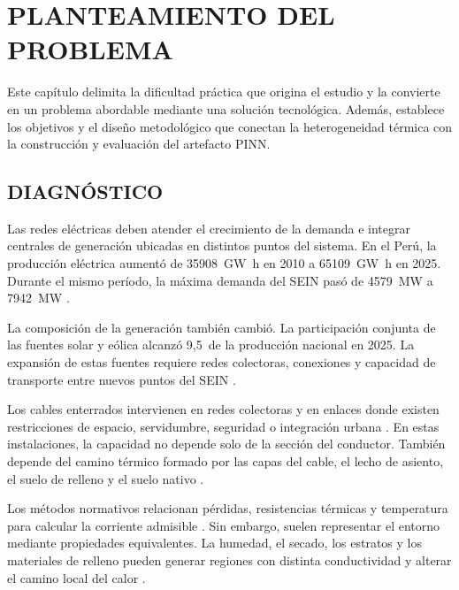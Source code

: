 \chapter{PLANTEAMIENTO DEL PROBLEMA}
\label{ch:planteamiento}

Este capítulo delimita la dificultad práctica que origina el estudio y la convierte en un problema abordable mediante una solución tecnológica. Además, establece los objetivos y el diseño metodológico que conectan la heterogeneidad térmica con la construcción y evaluación del artefacto PINN.

\section{DIAGNÓSTICO}
\label{sec:diagnostico}

Las redes eléctricas deben atender el crecimiento de la demanda e integrar centrales de generación ubicadas en distintos puntos del sistema. En el Perú, la producción eléctrica aumentó de \SI{35908}{\giga\watt\hour} en 2010 a \SI{65109}{\giga\watt\hour} en 2025. Durante el mismo período, la máxima demanda del SEIN pasó de \SI{4579}{\mega\watt} a \SI{7942}{\mega\watt} \parencites[sec.~10.4]{minem2025anuario2024}[cuadro~4]{minem2025indicadoresDiciembre}{coesMaximaDemanda}.

La composición de la generación también cambió. La participación conjunta de las fuentes solar y eólica alcanzó 9,5\,\pct{} de la producción nacional en 2025. La expansión de estas fuentes requiere redes colectoras, conexiones y capacidad de transporte entre nuevos puntos del SEIN \parencites{coes2023diagnostico2025_2034}{iea2025transmissiongrid}.

Los cables enterrados intervienen en redes colectoras y en enlaces donde existen restricciones de espacio, servidumbre, seguridad o integración urbana \parencite{cigre2023overheadLines}. En estas instalaciones, la capacidad no depende solo de la sección del conductor. También depende del camino térmico formado por las capas del cable, el lecho de asiento, el suelo de relleno y el suelo nativo \parencites{enescu2020}{enescu2021}.

Los métodos normativos relacionan pérdidas, resistencias térmicas y temperatura para calcular la corriente admisible \parencites{neher1957}{iec60287}{iec60853}. Sin embargo, suelen representar el entorno mediante propiedades equivalentes. La humedad, el secado, los estratos y los materiales de relleno pueden generar regiones con distinta conductividad y alterar el camino local del calor \parencites[4--6]{enescu2021}[1--3]{aldulaimi2024}.


